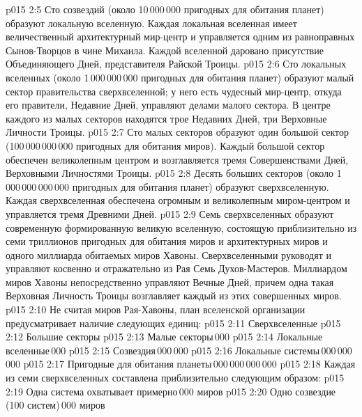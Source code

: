 \vs p015 2:5 \bibnobreakspace {} Сто созвездий (около 10\,000\,000 пригодных для обитания планет) образуют локальную вселенную. Каждая локальная вселенная имеет величественный архитектурный мир\hyp{}центр и управляется одним из равноправных Сынов\hyp{}Творцов в чине Михаила. Каждой вселенной даровано присутствие Объединяющего Дней, представителя Райской Троицы.
\vs p015 2:6 \bibnobreakspace {} Сто локальных вселенных (около 1\,000\,000\,000 пригодных для обитания планет) образуют малый сектор правительства сверхвселенной; у него есть чудесный мир\hyp{}центр, откуда его правители, Недавние Дней, управляют делами малого сектора. В центре каждого из малых секторов находятся трое Недавних Дней, три Верховные Личности Троицы.
\vs p015 2:7 \bibnobreakspace {} Сто малых секторов образуют один большой сектор (100\,000\,000\,000 пригодных для обитания миров). Каждый большой сектор обеспечен великолепным центром и возглавляется тремя Совершенствами Дней, Верховными Личностями Троицы.
\vs p015 2:8 \bibnobreakspace {} Десять больших секторов (около 1\,000\,000\,000\,000 пригодных для обитания планет) образуют сверхвселенную. Каждая сверхвселенная обеспечена огромным и великолепным миром\hyp{}центром и управляется тремя Древними Дней.
\vs p015 2:9 \bibnobreakspace {} Семь сверхвселенных образуют современную формированную великую вселенную, состоящую приблизительно из семи триллионов пригодных для обитания миров и архитектурных миров и одного миллиарда обитаемых миров Хавоны. Сверхвселенными руководят и управляют косвенно и отражательно из Рая Семь Духов\hyp{}Мастеров. Миллиардом миров Хавоны непосредственно управляют Вечные Дней, причем одна такая Верховная Личность Троицы возглавляет каждый из этих совершенных миров.
\vs p015 2:10 \pc Не считая миров Рая\hyp{}Хавоны, план вселенской организации предусматривает наличие следующих единиц:
\vs p015 2:11 Сверхвселенные
\vs p015 2:12 Большие секторы
\vs p015 2:13 Малые секторы\,000
\vs p015 2:14 Локальные вселенные\,000
\vs p015 2:15 Созвездия\,000\,000
\vs p015 2:16 Локальные системы\,000\,000\,000
\vs p015 2:17 \pc Пригодные для обитания планеты\,000\,000\,000\,000
\vs p015 2:18 Каждая из семи сверхвселенных составлена приблизительно следующим образом:
\vs p015 2:19 Одна система охватывает примерно\,000 миров
\vs p015 2:20 Одно созвездие (100 систем)\,000 миров
